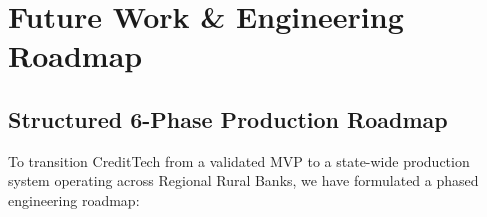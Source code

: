 \documentclass[11pt,a4paper,oneside]{report}
\begin{document}



\chapter{Future Work \& Engineering Roadmap}
\label{chap:future_work}

\section{Structured 6-Phase Production Roadmap}
To transition CreditTech from a validated MVP to a state-wide production system operating across Regional Rural Banks, we have formulated a phased engineering roadmap:
\end{document}
